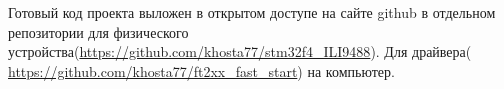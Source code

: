 	Готовый код проекта выложен в открытом доступе на сайте github в отдельном репозитории для физического устройства(\href{https://github.com/khosta77/stm32f4_ILI9488}{https://github.com/khosta77/stm32f4\_ILI9488}). Для драйвера( \href{https://github.com/khosta77/ft2xx_fast_start}{https://github.com/khosta77/ft2xx\_fast\_start}) на компьютер.


	
	
	
	
	
